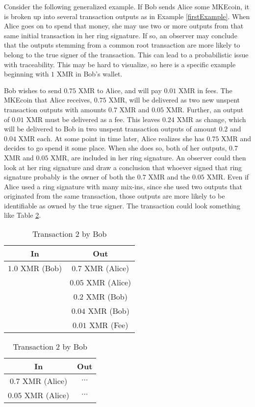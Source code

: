 \documentclass[12pt,english]{mrl}
\theoremstyle{definition}
\numberwithin{equation}{section}
\numberwithin{figure}{section}
\numberwithin{equation}{section}
\numberwithin{equation}{section}
\numberwithin{figure}{section}
\begin{document}
Consider the following generalized example. If Bob sends Alice some MKEcoin, it is broken up into several transaction outputs as in Example \ref{firstExample}. When Alice goes on to spend that money, she may use two or more outputs from that same initial transaction in her ring signature. If so, an observer may conclude that the outputs stemming from a common root transaction are more likely to belong to the true signer of the transaction. This can lead to a probabilistic issue with traceability. This may be hard to visualize, so here is a specific example beginning with $1$ XMR in Bob's wallet. 

Bob wishes to send $0.75$ XMR to Alice, and will pay $0.01$ XMR in fees. The MKEcoin that Alice receives, $0.75$ XMR, will be delivered as two new unspent transaction outputs with amounts $0.7$ XMR and $0.05$ XMR. Further, an output of $0.01$ XMR must be delivered as a fee. This leaves $0.24$ XMR as change, which will be delivered to Bob in two unspent transaction outputs of amount $0.2$ and $0.04$ XMR each. At some point in time later, Alice realizes she has $0.75$ XMR and decides to go spend it some place. When she does so, both of her outputs, $0.7$ XMR and $0.05$ XMR, are included in her ring signature. An observer could then look at her ring signature and draw a conclusion that whoever signed that ring signature probably is the owner of both the $0.7$ XMR and the $0.05$ XMR. Even if Alice used a ring signature with many mix-ins, since she used two outputs that originated from the same transaction, those outputs are more likely to be identifiable as owned by the true signer. The transaction could look something like Table \ref{linkByAssociation}.

\begin{table}[!htb]
    \caption{Linking transaction outputs by association}
    \label{linkByAssociation}
    \begin{subtable}{.5\linewidth}
      \centering
        \caption{Transaction $1$ by Bob}
        \begin{tabular}{|c|c|}\hline
            In & Out \\\hline
            $1.0$ XMR (Bob) & $0.7$ XMR (Alice)\\
             & $0.05$ XMR (Alice)\\
             & $0.2$ XMR (Bob)\\
             & $0.04$ XMR (Bob)\\
             & $0.01$ XMR (Fee)\\\hline
        \end{tabular}
    \end{subtable}%
    \begin{subtable}{.5\linewidth}
      \centering
        \caption{Transaction $2$ by Bob}
        \begin{tabular}{|c|c|}\hline
            In & Out \\\hline
            $0.7$ XMR (Alice) & $\cdots$ \\
            $0.05$ XMR (Alice) & $\cdots$ \\\hline
        \end{tabular}
    \end{subtable}%
\end{table}
 
\end{document}
